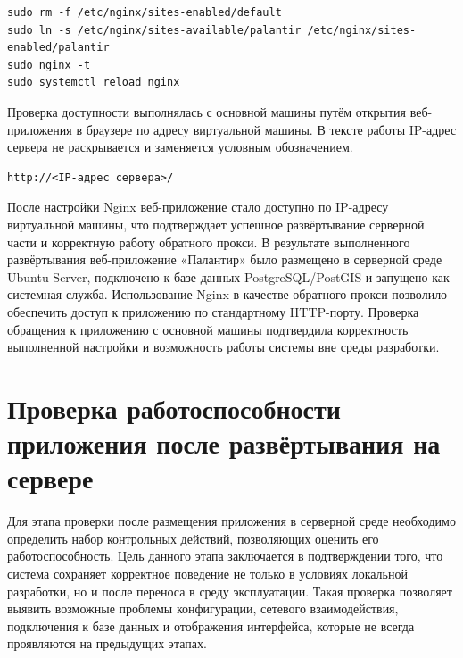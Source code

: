 \begin{code}
\vspace{-0.75cm}
\begin{verbatim}
sudo rm -f /etc/nginx/sites-enabled/default
sudo ln -s /etc/nginx/sites-available/palantir /etc/nginx/sites-enabled/palantir
sudo nginx -t
sudo systemctl reload nginx
\end{verbatim}
\end{code}

Проверка доступности выполнялась с основной машины путём открытия веб-приложения в браузере по адресу виртуальной машины. В тексте работы IP-адрес сервера не раскрывается и заменяется условным обозначением.

\begin{code}
\vspace{-0.75cm}
\begin{verbatim}
http://<IP-адрес сервера>/
\end{verbatim}
\end{code}

После настройки Nginx веб-приложение стало доступно по IP-адресу виртуальной машины, что подтверждает успешное развёртывание серверной части и корректную работу обратного прокси. В результате выполненного развёртывания веб-приложение «Палантир» было размещено в серверной среде Ubuntu Server, подключено к базе данных PostgreSQL/PostGIS и запущено как системная служба. Использование Nginx в качестве обратного прокси позволило обеспечить доступ к приложению по стандартному HTTP-порту. Проверка обращения к приложению с основной машины подтвердила корректность выполненной настройки и возможность работы системы вне среды разработки.

\section{Проверка работоспособности приложения после развёртывания на сервере}

Для этапа проверки после размещения приложения в серверной среде необходимо определить набор контрольных действий, позволяющих оценить его работоспособность. Цель данного этапа заключается в подтверждении того, что система сохраняет корректное поведение не только в условиях локальной разработки, но и после переноса в среду эксплуатации. Такая проверка позволяет выявить возможные проблемы конфигурации, сетевого взаимодействия, подключения к базе данных и отображения интерфейса, которые не всегда проявляются на предыдущих этапах.

